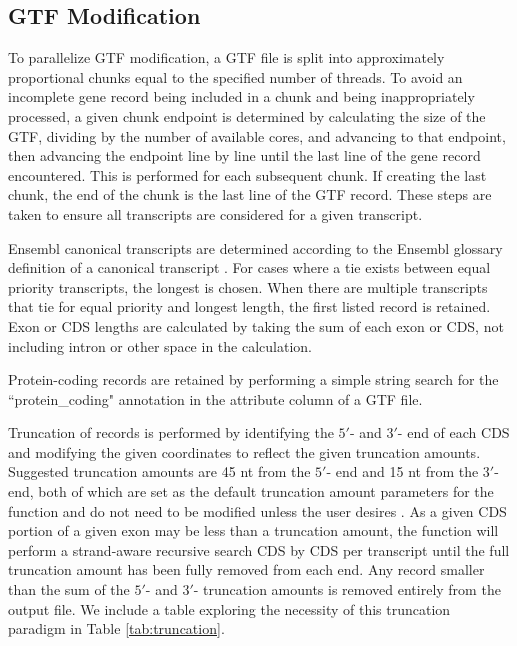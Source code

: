 \documentclass[10pt, oneside]{article}
\begin{document}
\subsection*{GTF Modification}
To parallelize GTF modification, a GTF file is split into approximately proportional chunks equal to the specified number of threads. To avoid an incomplete gene record being included in a chunk and being inappropriately processed, a given chunk endpoint is determined by calculating the size of the GTF, dividing by the number of available cores, and advancing to that endpoint, then advancing the endpoint line by line until the last line of the gene record encountered. This is performed for each subsequent chunk. If creating the last chunk, the end of the chunk is the last line of the GTF record. These steps are taken to ensure all transcripts are considered for a given transcript.\par

Ensembl canonical transcripts are determined according to the Ensembl glossary definition of a canonical transcript \cite{ensembl_canon}. For cases where a tie exists between equal priority transcripts, the longest is chosen. When there are multiple transcripts that tie for equal priority and longest length, the first listed record is retained. Exon or CDS lengths are calculated by taking the sum of each exon or CDS, not including intron or other space in the calculation. \par

Protein-coding records are retained by performing a simple string search for the ``protein\_coding" annotation in the attribute column of a GTF file. \par

Truncation of records is performed by identifying the $5'$- and $3'$- end of each CDS and modifying the given coordinates to reflect the given truncation amounts. Suggested truncation amounts are 45 nt from the $5'$- end and 15 nt from the $3'$- end, both of which are set as the default truncation amount parameters for the function and do not need to be modified unless the user desires \cite{ingolia_meth}. As a given CDS portion of a given exon may be less than a truncation amount, the function will perform a strand-aware recursive search CDS by CDS per transcript until the full truncation amount has been fully removed from each end. Any record smaller than the sum of the $5'$- and $3'$- truncation amounts is removed entirely from the output file. We include a table exploring the necessity of this truncation paradigm in Table \ref{tab:truncation}.\\
\end{document}

